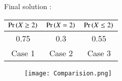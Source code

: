 \documentclass[journal,12pt,twocolumn]{IEEEtran}
\begin{document}
  Final solution :  
  
    \begin{center}
  
  \begin{tabular}{|c|c|c|}
    \hline
    $\Pr\left(X \geq 2\right)$ &  $\Pr \left(X = 2\right)$ & $\Pr\left(X \leq 2\right)$\\
    \hline
     0.75& 0.3& 0.55 \\
    \hline
    Case 1 &Case 2 &Case 3\\
    \hline
\end{tabular} 
\end{center}

\begin{figure}
    \centering
    \texttt{[image: Comparision.png]}
    
\end{figure}
\end{document}
